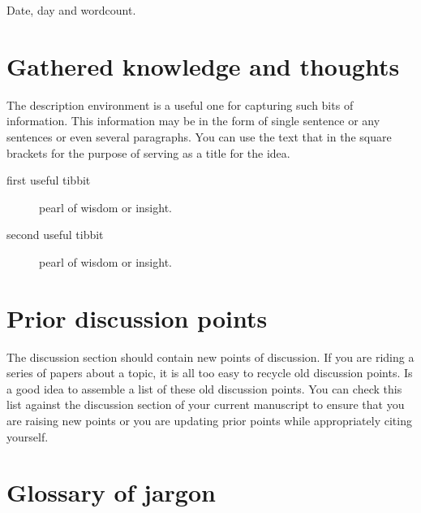 \documentclass[10pt,letterpaper]{article}
\begin{document}
\begin{table}[]
  \centering
  \caption{Date, day and wordcount.}
  \label{tab:my_label}
\end{table}

\section{Gathered knowledge and thoughts}
\label{knowledge}
The description environment is a useful one for capturing such bits of information. 
This information may be in the form of single sentence or any sentences or even several paragraphs.
You can use the text that in the square brackets for the purpose of serving as a title for the idea.


\begin{description}
  \item [first useful tibbit] pearl of wisdom or insight.
  \item [second useful tibbit] pearl of wisdom or insight.
\end{description}


\section{Prior discussion points}
The discussion section should contain new points of discussion.
If you are riding a series of papers about a topic, it is all too easy to recycle old discussion points.
Is a good idea to assemble a list of these old discussion points.
You can check this list against the discussion section of your current manuscript to ensure that you are raising new points or you are updating prior points while appropriately citing yourself. 





\section{Glossary of jargon}
\end{document}
